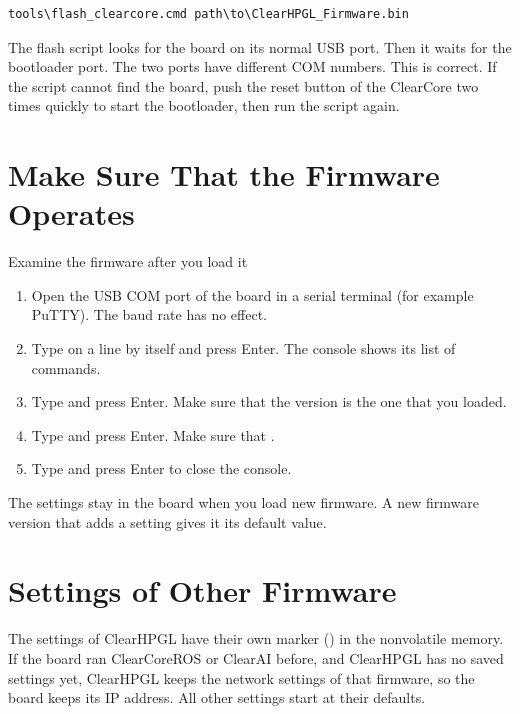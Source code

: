 \begin{lstlisting}[language=console]
tools\flash_clearcore.cmd path\to\ClearHPGL_Firmware.bin
\end{lstlisting}

\begin{note}
\notelabel The flash script looks for the board on its normal USB port. Then
it waits for the bootloader port. The two ports have different COM numbers.
This is correct. If the script cannot find the board, push the reset button
of the ClearCore two times quickly to start the bootloader, then run the
script again.
\end{note}

\section{Make Sure That the Firmware Operates}

\begin{procedure}{Examine the firmware after you load it}
\begin{enumerate}
  \item Open the USB COM port of the board in a serial terminal (for example
        PuTTY). The baud rate has no effect.
  \item Type  on a line by itself and press Enter. The console
        shows its list of commands.
  \item Type  and press Enter. Make sure that the version is the
        one that you loaded.
  \item Type  and press Enter. Make sure that .
  \item Type  and press Enter to close the console.
\end{enumerate}
\end{procedure}

The settings stay in the board when you load new firmware. A new firmware
version that adds a setting gives it its default value.

\section{Settings of Other Firmware}

The settings of ClearHPGL have their own marker () in the
nonvolatile memory. If the board ran ClearCoreROS or ClearAI before, and
ClearHPGL has no saved settings yet, ClearHPGL keeps the network settings of
that firmware, so the board keeps its IP address. All other settings start at
their defaults.
